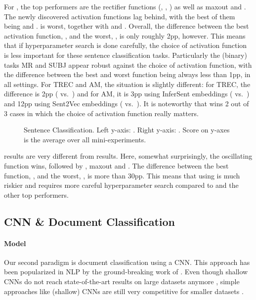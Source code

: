 For \best{}, the top performers are the rectifier functions (\relu{}, \lrelua{}, \prelu{}) as well as maxout and \pentan{}. The newly discovered activation functions lag behind, with the best of them being \minsin{} and \swish{}. \linear{} is worst, together with \elu{} and \cube. Overall, %
the difference between the best activation function, \relu{}, and the worst, \linear, is only roughly 2pp, however. This means that if hyperparameter search is done carefully,  the choice of activation function is less important for these sentence classification tasks. Particularly the (binary) tasks MR and SUBJ appear robust against the choice of activation function, with the difference between the best and worst function being always less than 1pp, in all settings. For TREC and AM, the situation is slightly different: for TREC, the difference is 2pp (\swish{} vs.\ \maxsig) and for AM, it is 3pp using InferSent embeddings (\swish{} vs.\ \cube) and 12pp using Sent2Vec embeddings (\relu{} vs.\  \linear). It is noteworthy that \swish{} wins 2 out of 3 cases in which the choice of activation function really matters. 
\begin{figure}[htb]
  \centering
  \scalebox{0.5}{}
  \caption{Sentence Classification. Left y-axis: \best. Right y-axis: \avg{}. Score on y-axes is the average over all mini-experiments.}
  \label{fig:sent}
\end{figure}

\avg{} results are very different from \best{} results. Here, somewhat surprisingly, the oscillating \mysin{} function wins, followed by \pentan{}, maxout and \swish. The difference between the best \avg{} function, \mysin, and the worst, \cube, is more than 30pp. This means that using \cube{} is much riskier and requires more careful hyperparameter search compared to \mysin{} and the other top performers. 

\subsection{CNN \& Document Classification}\label{sec:2}
\paragraph{Model} Our second paradigm is document classification using a CNN. This approach has been popularized in NLP by the ground-breaking work of \citet{Kim:2014}. Even though shallow CNNs do not reach state-of-the-art results on large datasets anymore \cite{Johnson:2017}, simple approaches like (shallow) CNNs are still very competitive for smaller datasets \cite{Joulin:2016}. 

